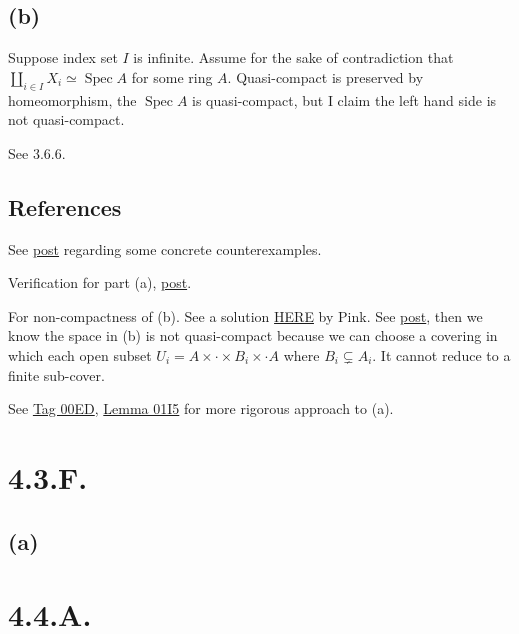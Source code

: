 \subsection{(b)}

Suppose index set $I$ is infinite. Assume for the sake of contradiction that $\amalg_{i\in I}X_i\simeq \operatorname{Spec}A$ for some ring $A$. Quasi-compact is preserved by homeomorphism, the $\operatorname{Spec}A$ is quasi-compact, but I claim the left hand side is not quasi-compact. 

See 3.6.6.

\subsection{References}

See \href{https://math.stackexchange.com/questions/778440/spectrum-of-a-product-of-rings-isomorphic-to-the-product-of-the-spectra}{post} regarding some concrete counterexamples.

Verification for part (a), \href{https://math.stackexchange.com/questions/321018/why-is-the-disjoint-union-of-a-finite-number-of-affine-schemes-an-affine-scheme#:~:text=We%20know%20that%20the%20disjoint,space%20is%20not%20quasi%2Dcompact.}{post}.

For non-compactness of (b). See a solution \href{https://metaphor.ethz.ch/x/2017/fs/401-3146-12L/ex/SolSheet6.pdf}{HERE} by Pink. See \href{https://math.stackexchange.com/questions/3038162/proving-mathbbn-is-not-compact}{post}, then we know the space in (b) is not quasi-compact because we can choose a covering in which each open subset $U_i=A\times\cdot\times B_i\times \cdot A$ where $B_i\subsetneq A_i$. It cannot reduce to a finite sub-cover.

See \href{https://stacks.math.columbia.edu/tag/00ED}{Tag 00ED}, \href{https://stacks.math.columbia.edu/tag/01I5}{Lemma 01I5} for more rigorous approach to (a).

\section{4.3.F.}\label{4.3.F.}

\subsection{(a)}



\section{4.4.A.}\label{4.4.A.}

